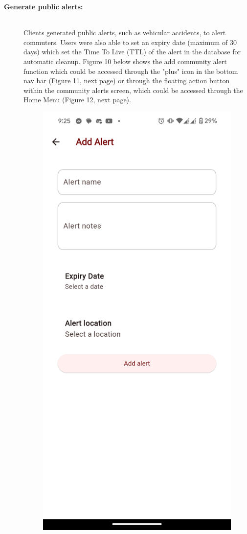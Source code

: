 \documentclass{icsthesis}
\begin{document}
\begin{mainmatter}
\begin{description}
			\item[\textbf{Generate public alerts:}] \hfill \\
				Clients generated public alerts, such as vehicular accidents, to alert commuters. Users were also able to set an expiry date (maximum of 30 days) which set the Time To Live (TTL) of the alert in the database for automatic cleanup.
				Figure 10 below shows the add community alert function which could be accessed through the "plus" icon in the bottom nav bar (Figure 11, next page) or through the floating action button within the community alerts screen, which could be accessed through the Home Menu (Figure 12, next page).
		
		\begin{figure}[!h]
			\centering
				\includegraphics[scale=0.1]{./figures/client/add alert.png}

\end{figure}
\end{description}
\end{mainmatter}
\end{document}
